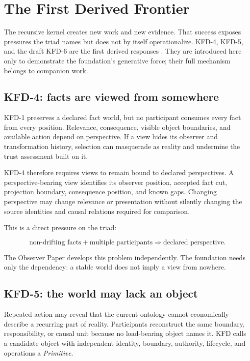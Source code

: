 \section{The First Derived Frontier}
\label{sec:frontier}

The recursive kernel creates new work and new evidence. That success exposes
pressures the triad names but does not by itself operationalize. KFD-4, KFD-5,
and the draft KFD-6 are the first derived responses
\cite{kfd2026alpha42}. They are introduced here only to demonstrate the
foundation's generative force; their full mechanism belongs to companion
work.

\subsection{KFD-4: facts are viewed from somewhere}

KFD-1 preserves a declared fact world, but no participant consumes every fact
from every position. Relevance, consequence, visible object boundaries, and
available action depend on perspective. If a view hides its observer and
transformation history, selection can masquerade as reality and undermine the
trust assessment built on it.

KFD-4 therefore requires views to remain bound to declared perspectives. A
perspective-bearing view identifies its observer position, accepted fact cut,
projection boundary, consequence position, and known gaps. Changing
perspective may change relevance or presentation without silently changing
the source identities and causal relations required for comparison.

This is a direct pressure on the triad:

\begin{equation}
\text{non-drifting facts} + \text{multiple participants}
\Longrightarrow \text{declared perspective}.
\end{equation}

The Observer Paper develops this problem independently. The foundation needs
only the dependency: a stable world does not imply a view from nowhere.

\subsection{KFD-5: the world may lack an object}

Repeated action may reveal that the current ontology cannot economically
describe a recurring part of reality. Participants reconstruct the same
boundary, responsibility, or causal unit because no load-bearing object names
it. KFD calls a candidate object with independent identity, boundary,
authority, lifecycle, and operations a \emph{Primitive}.

